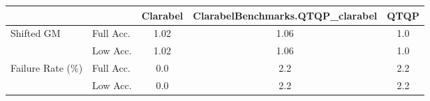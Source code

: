 \begin{tabular}{|l|l|c|c|c|}
  \hline
   &  & \textbf{Clarabel} & \textbf{ClarabelBenchmarks.QTQP\_clarabel} & \textbf{QTQP} \\
  \hline
  Shifted GM & Full Acc. & 1.02 & 1.06 & 1.0 \\
   & Low Acc. & 1.02 & 1.06 & 1.0 \\
  Failure Rate (\%) & Full Acc. & 0.0 & 2.2 & 2.2 \\
   & Low Acc. & 0.0 & 2.2 & 2.2 \\
  \hline
\end{tabular}
